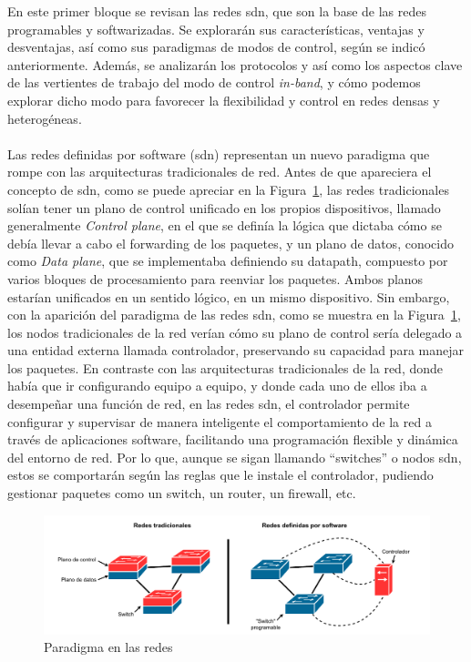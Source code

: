 En este primer bloque se revisan las redes \gls{sdn}, que son la base de las redes programables y softwarizadas. Se explorarán sus características, ventajas y desventajas, así como sus paradigmas de modos de control, según se indicó anteriormente. Además, se analizarán los protocolos y así como los aspectos clave de las vertientes de trabajo del modo de control \textit{in-band}, y cómo podemos explorar dicho modo para favorecer la flexibilidad y control en redes densas y heterogéneas.\\
\\
Las redes definidas por software (\gls{sdn}) representan un nuevo paradigma que rompe con las arquitecturas tradicionales de red. Antes de que apareciera el concepto de \gls{sdn}, como se puede apreciar en la Figura~\ref{fig:sdn_paradigma}, las redes tradicionales solían tener un plano de control unificado en los propios dispositivos, llamado generalmente \textit{Control plane}, en el que se definía la lógica que dictaba cómo se debía llevar a cabo el forwarding de los paquetes, y un plano de datos, conocido como \textit{Data plane}, que se implementaba definiendo su datapath, compuesto por varios bloques de procesamiento para reenviar los paquetes. Ambos planos estarían unificados en un sentido lógico, en un mismo dispositivo. Sin embargo, con la aparición del paradigma de las redes \gls{sdn}, como se muestra en la Figura~\ref{fig:sdn_paradigma}, los nodos tradicionales de la red verían cómo su plano de control sería delegado a una entidad externa llamada controlador, preservando su capacidad para manejar los paquetes. En contraste con las arquitecturas tradicionales de la red, donde había que ir configurando equipo a equipo, y donde cada uno de ellos iba a desempeñar una función de red, en las redes \gls{sdn}, el controlador permite configurar y supervisar de manera inteligente el comportamiento de la red a través de aplicaciones software, facilitando una programación flexible y dinámica del entorno de red. Por lo que, aunque se sigan llamando ``switches'' o nodos \gls{sdn}, estos se comportarán según las reglas que le instale el controlador, pudiendo gestionar paquetes como un switch, un router, un firewall, etc. 

\begin{figure}[ht!]
\centering
\includegraphics[width=\textwidth]{fig/02_sota/sota_1_sdn_idea.drawio.pdf}
\caption{Paradigma en las redes }
\label{fig:sdn_paradigma}
\end{figure}

